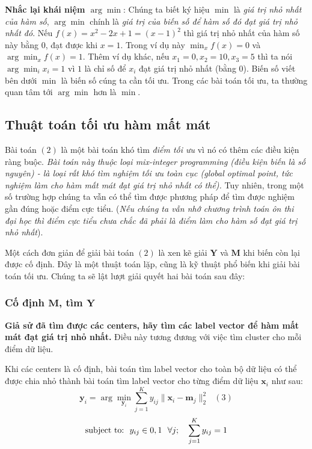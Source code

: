 \textbf{Nhắc lại khái niệm $\arg\min$}: Chúng ta biết ký hiệu $\min$ là \textit{giá trị nhỏ nhất của hàm số}, $\arg\min$ chính là \textit{giá trị của biến số để hàm số đó đạt giá trị nhỏ nhất đó}. Nếu $f(x) = x^2 -2x + 1 = (x-1)^2 $ thì giá trị nhỏ nhất của hàm số này bằng 0, đạt được khi $x = 1$. Trong ví dụ này $\min_{x} f(x) = 0$ và $\arg\min_{x} f(x) = 1$. Thêm ví dụ khác, nếu $x_1 = 0, x_2 = 10, x_3 = 5$ thì ta nói $\arg\min_{i} x_i = 1$ vì $1$ là chỉ số để $x_i$ đạt giá trị nhỏ nhất (bằng $0$). Biến số viết bên dưới $\min$ là biến số cúng ta cần tối ưu. Trong các bài toán tối ưu, ta thường quan tâm tới $\arg\min$ hơn là $\min$. 
 
\subsection{Thuật toán tối ưu hàm mất mát}
Bài toán $(2)$ là một bài toán khó tìm \textit{điểm tối ưu} vì nó có thêm các điều kiện ràng buộc. \textit{Bài toán này thuộc loại mix-integer programming (điều kiện biến là số nguyên) - là loại rất khó tìm nghiệm tối ưu toàn cục (global optimal point, tức nghiệm làm cho hàm mất mát đạt giá trị nhỏ nhất có thể).} Tuy nhiên, trong một số trường hợp chúng ta vẫn có thể tìm được phương pháp để tìm được nghiệm gần đúng hoặc điểm cực tiểu. (\textit{Nếu chúng ta vẫn nhớ chương trình toán ôn thi đại học thì điểm cực tiểu chưa chắc đã phải là điểm làm cho hàm số đạt giá trị nhỏ nhất}). 
 
Một cách đơn giản để giải bài toán $(2)$ là xen kẽ giải $\mathbf{Y}$ và $ \mathbf{M}$ khi biến còn lại được cố định. Đây là một thuật toán lặp, cũng là kỹ thuật phổ biến khi giải bài toán tối ưu. Chúng ta sẽ lật lượt giải quyết hai bài toán sau đây: 
 
 
\subsubsection{Cố định $\mathbf{M} $, tìm $\mathbf{Y}$ }
\textbf{Giả sử đã tìm được các centers, hãy tìm các label vector để hàm mất mát đạt giá trị nhỏ nhất.} Điều này tương đương với việc tìm cluster cho mỗi điểm dữ liệu. 
 
Khi các centers là cố định, bài toán tìm label vector cho toàn bộ dữ liệu có thể được chia nhỏ thành bài toán tìm label vector cho từng điểm dữ liệu $\mathbf{x}_i$ như sau: 
\begin{equation}
\mathbf{y}_i = \arg\min_{\mathbf{y}_i} \sum_{j=1}^K y_{ij}\|\mathbf{x}_i - \mathbf{m}_j\|_2^2 ~~~ (3) 
\end{equation}
\begin{equation}
\text{subject to:} ~~ y_{ij} \in \\{0, 1\\}~~ \forall j;~~~ \sum_{j = 1}^K y_{ij} = 1 
\end{equation}
 

